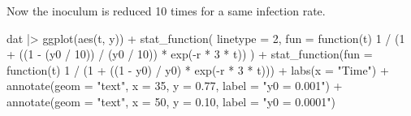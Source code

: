 \documentclass[
  letterpaper,
  DIV=11,
  numbers=noendperiod]{scrreprt}
\newenvironment{Shaded}{\begin{snugshade}}{\end{snugshade}}
\newcommand{\AttributeTok}[1]{\textcolor[rgb]{0.40,0.45,0.13}{#1}}
\newcommand{\ControlFlowTok}[1]{\textcolor[rgb]{0.00,0.23,0.31}{#1}}
\newcommand{\DecValTok}[1]{\textcolor[rgb]{0.68,0.00,0.00}{#1}}
\newcommand{\FloatTok}[1]{\textcolor[rgb]{0.68,0.00,0.00}{#1}}
\newcommand{\FunctionTok}[1]{\textcolor[rgb]{0.28,0.35,0.67}{#1}}
\newcommand{\NormalTok}[1]{\textcolor[rgb]{0.00,0.23,0.31}{#1}}
\newcommand{\SpecialCharTok}[1]{\textcolor[rgb]{0.37,0.37,0.37}{#1}}
\newcommand{\StringTok}[1]{\textcolor[rgb]{0.13,0.47,0.30}{#1}}
\begin{document}
Now the inoculum is reduced 10 times for a same infection rate.

\begin{Shaded}
\begin{Highlighting}[]
\NormalTok{dat }\SpecialCharTok{|\textgreater{}}
  \FunctionTok{ggplot}\NormalTok{(}\FunctionTok{aes}\NormalTok{(t, y)) }\SpecialCharTok{+}
  \FunctionTok{stat\_function}\NormalTok{(}
    \AttributeTok{linetype =} \DecValTok{2}\NormalTok{,}
    \AttributeTok{fun =} \ControlFlowTok{function}\NormalTok{(t) }\DecValTok{1} \SpecialCharTok{/}\NormalTok{ (}\DecValTok{1} \SpecialCharTok{+}\NormalTok{ ((}\DecValTok{1} \SpecialCharTok{{-}}\NormalTok{ (y0 }\SpecialCharTok{/} \DecValTok{10}\NormalTok{)) }\SpecialCharTok{/}\NormalTok{ (y0 }\SpecialCharTok{/} \DecValTok{10}\NormalTok{)) }\SpecialCharTok{*} \FunctionTok{exp}\NormalTok{(}\SpecialCharTok{{-}}\NormalTok{r }\SpecialCharTok{*} \DecValTok{3} \SpecialCharTok{*}\NormalTok{ t))}
\NormalTok{  ) }\SpecialCharTok{+}
  \FunctionTok{stat\_function}\NormalTok{(}\AttributeTok{fun =} \ControlFlowTok{function}\NormalTok{(t) }\DecValTok{1} \SpecialCharTok{/}\NormalTok{ (}\DecValTok{1} \SpecialCharTok{+}\NormalTok{ ((}\DecValTok{1} \SpecialCharTok{{-}}\NormalTok{ y0) }\SpecialCharTok{/}\NormalTok{ y0) }\SpecialCharTok{*} \FunctionTok{exp}\NormalTok{(}\SpecialCharTok{{-}}\NormalTok{r }\SpecialCharTok{*} \DecValTok{3} \SpecialCharTok{*}\NormalTok{ t))) }\SpecialCharTok{+}
  \FunctionTok{labs}\NormalTok{(}\AttributeTok{x =} \StringTok{"Time"}\NormalTok{) }\SpecialCharTok{+}
  \FunctionTok{annotate}\NormalTok{(}\AttributeTok{geom =} \StringTok{"text"}\NormalTok{, }\AttributeTok{x =} \DecValTok{35}\NormalTok{, }\AttributeTok{y =} \FloatTok{0.77}\NormalTok{, }\AttributeTok{label =} \StringTok{"y0 = 0.001"}\NormalTok{) }\SpecialCharTok{+}
  \FunctionTok{annotate}\NormalTok{(}\AttributeTok{geom =} \StringTok{"text"}\NormalTok{, }\AttributeTok{x =} \DecValTok{50}\NormalTok{, }\AttributeTok{y =} \FloatTok{0.10}\NormalTok{, }\AttributeTok{label =} \StringTok{"y0 = 0.0001"}\NormalTok{)}
\end{Highlighting}
\end{Shaded}
\end{document}
